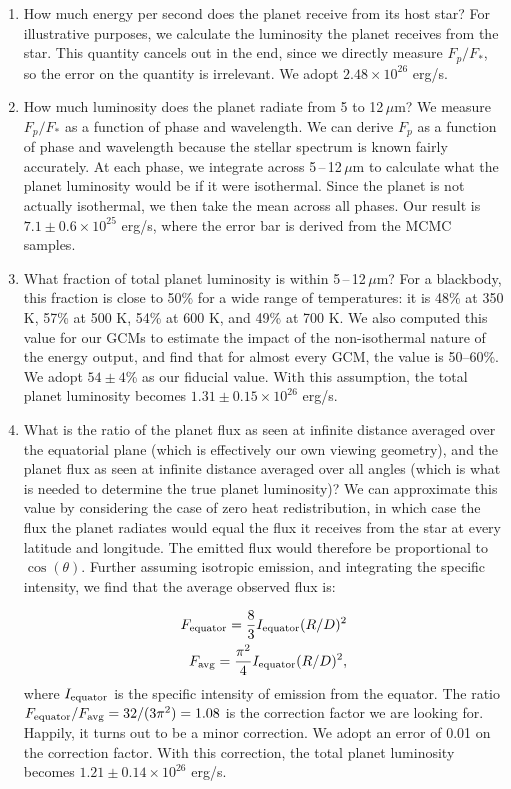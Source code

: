 \documentclass[pdflatex,sn-standardnature]{sn-jnl}%
\begin{document}
\begin{enumerate}
\item How much energy per second does the planet receive from its host star?  For illustrative purposes, we calculate the luminosity the planet receives from the star.  This quantity cancels out in the end, since we directly measure $F_p/F_*$, so the error on the quantity is irrelevant. We adopt $2.48 \times 10^{26}$ erg/s.
\item How much luminosity does the planet radiate from 5 to 12\,$\mu$m?  We measure $F_p/F_*$ as a function of phase and wavelength.  We can derive $F_p$ as a function of phase and wavelength because the stellar spectrum is known fairly accurately.  At each phase, we integrate across 5\,--\,12\,$\mu$m to calculate what the planet luminosity would be if it were isothermal.  Since the planet is not actually isothermal, we then take the mean across all phases.  Our result is $7.1 \pm 0.6 \times 10^{25}$ erg/s, where the error bar is derived from the MCMC samples.
\item What fraction of total planet luminosity is within 5\,--\,12\,$\mu$m?  For a blackbody, this fraction is close to 50\% for a wide range of temperatures: it is 48\% at 350 K, 57\% at 500 K, 54\% at 600 K, and 49\% at 700 K.  We also computed this value for our GCMs to estimate the impact of the non-isothermal nature of the energy output, and find that for almost every GCM, the value is 50--60\%.  We adopt $54 \pm 4$\% as our fiducial value.  With this assumption, the total planet luminosity becomes $1.31 \pm 0.15 \times 10^{26}$ erg/s.
\item What is the ratio of the planet flux as seen at infinite distance averaged over the equatorial plane (which is effectively our own viewing geometry), and the planet flux as seen at infinite distance averaged over all angles (which is what is needed to determine the true planet luminosity)?  We can approximate this value by considering the case of zero heat redistribution, in which case the flux the planet radiates would equal the flux it receives from the star at every latitude and longitude.  The emitted flux would therefore be proportional to $\cos(\theta)$.  Further assuming isotropic emission, and integrating the specific intensity, we find that the average observed flux is:

\begin{align}
F_{\rm equator} = \frac{8}{3} I_{\rm equator} (R/D)^2\\
F_{\rm avg} = \frac{\pi^2}{4} I_{\rm equator} (R/D)^2,
\end{align}
where $I_{\rm equator}$ is the specific intensity of emission from the equator.  The ratio $F_{\rm equator} / F_{\rm avg} = 32/(3\pi^2) = 1.08$ is the correction factor we are looking for.  Happily, it turns out to be a minor correction. We adopt an error of 0.01 on the correction factor.  With this correction, the total planet luminosity becomes $1.21 \pm 0.14 \times 10^{26}$ erg/s.
\end{enumerate}
\end{document}
